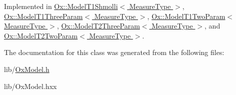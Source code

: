 Implemented in \hyperlink{class_ox_1_1_model_t1_shmolli_a846fb817183738d5c2b3f9f126c1597b}{Ox\-::\-Model\-T1\-Shmolli$<$ Measure\-Type $>$}, \hyperlink{class_ox_1_1_model_t1_three_param_afc6ffe41934c513e12a45cc5821fddca}{Ox\-::\-Model\-T1\-Three\-Param$<$ Measure\-Type $>$}, \hyperlink{class_ox_1_1_model_t1_two_param_aa090c6834141f00a966eebd6b0415e44}{Ox\-::\-Model\-T1\-Two\-Param$<$ Measure\-Type $>$}, \hyperlink{class_ox_1_1_model_t2_three_param_a7a6d2bae4e394a99e9e8943af9f344d0}{Ox\-::\-Model\-T2\-Three\-Param$<$ Measure\-Type $>$}, and \hyperlink{class_ox_1_1_model_t2_two_param_a64afe7ef809a611d93df0d8f695f1a22}{Ox\-::\-Model\-T2\-Two\-Param$<$ Measure\-Type $>$}.



The documentation for this class was generated from the following files\-:\begin{DoxyCompactItemize}
\item 
lib/\hyperlink{_ox_model_8h}{Ox\-Model.\-h}\item 
lib/Ox\-Model.\-hxx\end{DoxyCompactItemize}
